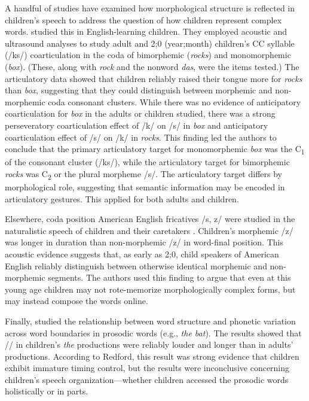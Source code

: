 \documentclass[a4paper,man,floatsintext,natbib,donotrepeattitle, apacite]{apa6}
\begin{document}
A handful of studies have examined how morphological structure is reflected in children's speech to address the question of how children represent complex words. \citet{songEffectsCoarticulationMorphological2013} studied this in English-learning children. They employed acoustic and ultrasound analyses to study adult and 2;0 (year;month) children’s CC syllable (/ks/) coarticulation in the coda of bimorphemic (\textit{rocks}) and monomorphemic (\textit{box}). (These, along with \textit{rock} and the nonword \textit{das}, were the items tested.) The articulatory data showed that children reliably raised their tongue more for \textit{rocks} than \textit{box}, suggesting that they could distinguish between morphemic and non-morphemic coda consonant clusters. While there was no evidence of anticipatory coarticulation for \textit{box} in the adults or children studied, there was a strong perseveratory coarticulation effect of /k/ on /s/ in \textit{box} and anticipatory coarticulation effect of /s/ on /k/ in \textit{rocks}. This finding led the authors to conclude that the primary articulatory target for monomorphemic \textit{box} was the C\textsubscript{1} of the consonant cluster (/ks/), while the articulatory target for bimorphemic \textit{rocks} was C\textsubscript{2} or the plural morpheme /s/. The articulatory target differs by morphological role, suggesting that semantic information may be encoded in articulatory gestures. This applied for both adults and children.

Elsewhere, coda position American English fricatives /s, z/ were studied in the naturalistic speech of children and their caretakers \citep{songDurationalCuesFricative2013}. Children’s morphemic /z/ was longer in duration than non-morphemic /z/ in word-final position. This acoustic evidence suggests that, as early as 2;0, child speakers of American English reliably distinguish between otherwise identical morphemic and non-morphemic segments. The authors used this finding to argue that even at this young age children may not rote-memorize morphologically complex forms, but may instead compose the words online.

Finally, \citet{redfordGrammaticalWordProduction2018} studied the relationship between word structure and phonetic variation across word boundaries in prosodic words (e.g., \textit{the bat}). The results showed that /\textschwa/ in children's \textit{the} productions were reliably louder and longer than in adults' productions. According to Redford, this result was strong evidence that children exhibit immature timing control, but the results were inconclusive concerning children's speech organization---whether children accessed the prosodic words holistically or in parts.
\end{document}
